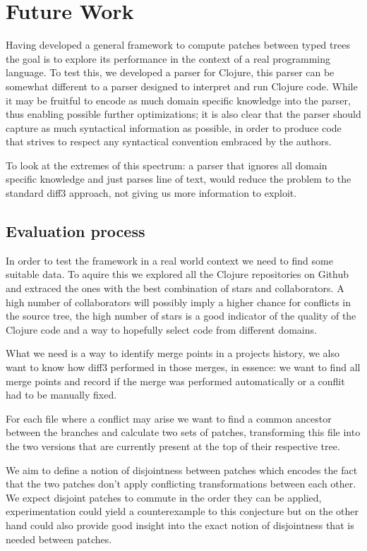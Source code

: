 \documentclass[11pt]{article}
\begin{document}
\section{Future Work}\label{future work}

Having developed a general framework to compute patches between typed trees the 
goal is to explore its performance in the context of a real programming 
language.
To test this, we developed a parser for Clojure, this parser can be somewhat 
different to a parser designed to interpret and run Clojure code. While it may 
be fruitful to encode as much domain specific knowledge into the parser, thus 
enabling possible further optimizations; it is also clear that the parser should 
capture as much syntactical information as possible, in order to produce code 
that strives to respect any syntactical convention embraced by the authors.

To look at the extremes of this spectrum: a parser that ignores all domain
specific knowledge and just parses line of text, would reduce the problem to the 
standard diff3 approach, not giving us more information to exploit.

\subsection{Evaluation process}

In order to test the framework in a real world context we need to find some suitable data. To aquire this 
we explored all the Clojure repositories on Github and extraced the ones with the best combination of 
stars and collaborators. A high number of collaborators will possibly imply a higher chance for conflicts in
the source tree, the high number of stars is a good indicator of the quality of 
the Clojure code and a way to hopefully select code from different domains.

What we need is a way to identify merge points in a projects history, we also 
want to know how diff3 performed in those merges, in essence: we want to find all 
merge points and record if the merge was performed automatically or a conflit 
had to be manually fixed.

For each file where a conflict may arise we want to find a common ancestor 
between the branches and calculate two sets of patches, transforming this file 
into the two versions that are currently present at the top of their respective 
tree. 

We aim to define a notion of disjointness between patches which 
encodes the fact that the two patches don't apply conflicting transformations 
between each other. We expect disjoint patches to commute in the order they can 
be applied, experimentation could yield a counterexample to this conjecture but 
on the other hand could also provide good insight into the exact notion of 
disjointness that is needed between patches.
\end{document}
